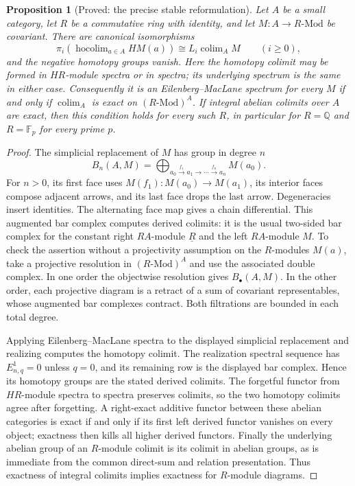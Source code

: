 \documentclass[11pt,a4paper]{article}
\newtheorem{proposition}[theorem]{Proposition}
\theoremstyle{definition}
\begin{document}
\begin{proposition}[Proved: the precise stable reformulation]\label{main:stable}
Let $A$ be a small category, let $R$ be a commutative ring with identity, and
let $M:A\to R\text{-}\mathrm{Mod}$ be covariant. There are canonical
isomorphisms
\[
 \pi_i\!\left(\operatorname{hocolim}_{a\in A} HM(a)\right)
 \cong L_i\operatorname{colim}_A M\qquad(i\geq0),
\]
and the negative homotopy groups vanish. Here the homotopy colimit may be
formed in $HR$-module spectra or in spectra; its underlying spectrum is the
same in either case. Consequently it is an Eilenberg--MacLane spectrum for
every $M$ if and only if $\operatorname{colim}_A$ is exact on
$(R\text{-}\mathrm{Mod})^A$. If integral abelian colimits over $A$ are exact,
then this condition holds for every such $R$, in particular for
$R=\mathbb Q$ and $R=\mathbb F_p$ for every prime $p$.
\end{proposition}
\begin{proof}
The simplicial replacement of $M$ has group in degree $n$
\[
 B_n(A,M)=\bigoplus_{a_0\xrightarrow{f_1}a_1\to\cdots\xrightarrow{f_n}a_n}
 M(a_0).
\]
For $n>0$, its first face uses $M(f_1):M(a_0)\to M(a_1)$,
its interior faces compose adjacent arrows, and its last face drops the
last arrow. Degeneracies insert identities. The alternating face map gives
a chain differential. This augmented bar complex computes derived colimits:
it is the usual two-sided bar complex for the constant right $RA$-module
$\underline R$ and the left $RA$-module $M$. To check the assertion without
a projectivity assumption on the $R$-modules $M(a)$, take a projective
resolution in $(R\text{-}\mathrm{Mod})^A$ and use the associated double
complex. In one order the objectwise resolution gives $B_\bullet(A,M)$.
In the other order, each projective diagram is a retract of a sum of
covariant representables, whose augmented bar complexes contract. Both
filtrations are bounded in each total degree.

Applying Eilenberg--MacLane spectra to the displayed simplicial
replacement and realizing computes the homotopy colimit. The realization
spectral sequence has $E^1_{n,q}=0$ unless $q=0$, and its remaining row is
the displayed bar complex. Hence its homotopy groups are the stated derived
colimits. The forgetful functor from $HR$-module spectra to spectra
preserves colimits, so the two homotopy colimits agree after forgetting.
A right-exact additive functor between these abelian categories is exact
if and only if its first left derived functor vanishes on every object;
exactness then kills all higher derived functors. Finally the underlying
abelian group of an $R$-module colimit is its colimit in abelian groups,
as is immediate from the common direct-sum and relation presentation.
Thus exactness of integral colimits implies exactness for $R$-module
diagrams.
\end{proof}
\end{document}
